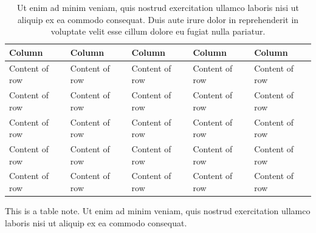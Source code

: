 \begin{table}[h!]
\centering
\begin{threeparttable}
\scriptsize
\sffamily
\caption[Caption for the LOT]{
Ut enim ad minim veniam, quis nostrud exercitation ullamco laboris nisi ut aliquip ex ea commodo consequat. Duis aute irure dolor in reprehenderit in voluptate velit esse cillum dolore eu fugiat nulla pariatur.
}
\label{tbl:table}
\begin{tabular}{ 
>{\raggedright\arraybackslash}m{2.3cm}>{\raggedright\arraybackslash}m{2.3cm} >{\raggedright\arraybackslash}m{2.3cm} >{\raggedright\arraybackslash}m{2.3cm} >{\raggedright\arraybackslash}m{2.3cm}} 
\toprule 
\textbf{Column} & \textbf{Column} & \textbf{Column} & \textbf{Column} & \textbf{Column} \\
\midrule
Content of row & Content of row & Content of row & Content of row & Content of row \\
Content of row & Content of row & Content of row & Content of row & Content of row \\
Content of row & Content of row & Content of row & Content of row & Content of row \\
Content of row & Content of row & Content of row & Content of row & Content of row \\
Content of row & Content of row & Content of row & Content of row & Content of row \\
\bottomrule
\end{tabular}
\begin{tablenotes}
\item This is a table note. Ut enim ad minim veniam, quis nostrud exercitation ullamco laboris nisi ut aliquip ex ea commodo consequat.
\end{tablenotes}
\end{threeparttable}
\end{table} 
